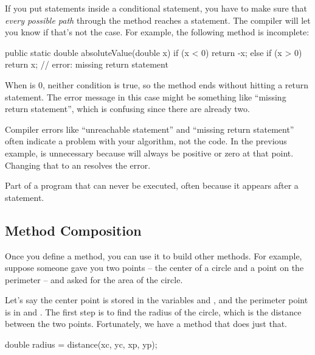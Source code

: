 If you put  statements inside a conditional statement, you have to make sure that {\em every possible path} through the method reaches a  statement.
The compiler will let you know if that's not the case.
For example, the following method is incomplete:

\begin{code}
public static double absoluteValue(double x) {
    if (x < 0) {
        return -x;
    } else if (x > 0) {
        return x;
    }
    // error: missing return statement
}
\end{code}

When  is 0, neither condition is true, so the method ends without hitting a return statement.
The error message in this case might be something like ``missing return statement'', which is confusing since there are already two.

Compiler errors like ``unreachable statement'' and ``missing return statement'' often indicate a problem with your algorithm, not the code.
In the previous example,  is unnecessary because  will always be positive or zero at that point.
Changing that  to an  resolves the error.


\begin{description}

Part of a program that can never be executed, often because it appears after a  statement.

\end{description}


\subsection*{Method Composition}


Once you define a method, you can use it to build other methods.
For example, suppose someone gave you two points -- the center of a circle and a point on the perimeter -- and asked for the area of the circle.

Let's say the center point is stored in the variables  and , and the perimeter point is in  and .
The first step is to find the radius of the circle, which is the distance between the two points.
Fortunately, we have a method that does just that.

\begin{code}
double radius = distance(xc, yc, xp, yp);
\end{code}

